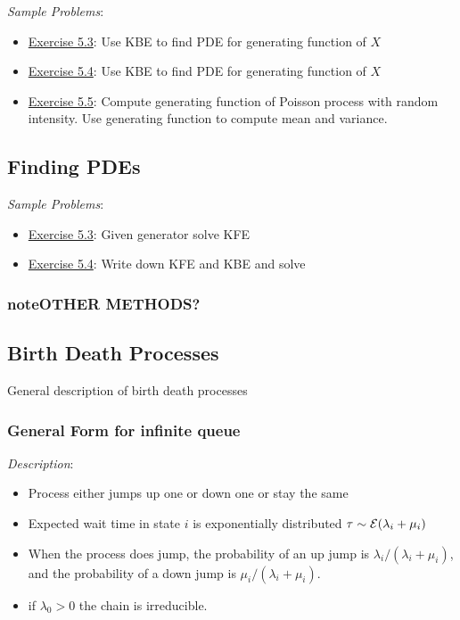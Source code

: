 \documentclass[12pt]{article}
\begin{document}
\textit{Sample Problems}: 
\begin{itemize}[nolistsep]
    \item \hyperref[Exercise 5.3]{Exercise 5.3}: Use KBE to find PDE for generating function of \( X \)
    \item \hyperref[Exercise 5.4]{Exercise 5.4}: Use KBE to find PDE for generating function of \( X \)
    \item \hyperref[Exercise 5.5]{Exercise 5.5}: Compute generating function of Poisson process with random intensity. Use generating function to compute mean and variance.
\end{itemize}



\subsection{Finding PDEs}



\textit{Sample Problems}: 
\begin{itemize}[nolistsep]
    \item \hyperref[Exercise 5.3]{Exercise 5.3}: Given generator solve KFE
    \item \hyperref[Exercise 5.4]{Exercise 5.4}: Write down KFE and KBE and solve
\end{itemize}


\subsubsection{note{OTHER METHODS?}}

\subsection{Birth Death Processes}

General description of birth death processes

\subsubsection{General Form for infinite queue}
\textit{Description}:
\begin{itemize}[nolistsep]
    \item Process either jumps up one or down one or stay the same
    \item Expected wait time in state \( i \) is exponentially distributed \( \tau \sim \mathcal{E}( \lambda_i + \mu_i) \)
    \item When the process does jump, the probability of an up jump is \( \lambda_i / (\lambda_i+\mu_i) \), and the probability of a down jump is \( \mu_i / (\lambda_i+\mu_i) \).
    \item if \( \lambda_0 > 0 \) the chain is irreducible.
\end{itemize}
\end{document}
